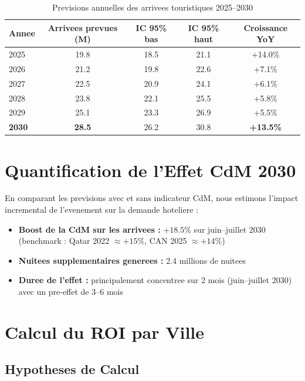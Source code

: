 \documentclass[12pt,a4paper]{report}
\begin{document}
\begin{itemize}[leftmargin=1.5em]
\begin{table}[H]
\centering\small\renewcommand{\arraystretch}{1.4}
\begin{tabular}{lcccc}
\toprule
\textbf{Annee} & \textbf{Arrivees prevues (M)} &
  \textbf{IC 95\% bas} & \textbf{IC 95\% haut} & \textbf{Croissance YoY} \\
\midrule
2025 & 19.8 & 18.5 & 21.1 & +14.0\% \\
2026 & 21.2 & 19.8 & 22.6 & +7.1\% \\
2027 & 22.5 & 20.9 & 24.1 & +6.1\% \\
2028 & 23.8 & 22.1 & 25.5 & +5.8\% \\
2029 & 25.1 & 23.3 & 26.9 & +5.5\% \\
\textbf{2030} & \textbf{28.5} & 26.2 & 30.8 & \textbf{+13.5\%} \\
\bottomrule
\end{tabular}
\caption{Previsions annuelles des arrivees touristiques 2025--2030}
\end{table}

\section{Quantification de l'Effet CdM 2030}

En comparant les previsions avec et sans indicateur CdM, nous estimons
l'impact incremental de l'evenement sur la demande hoteliere :

\begin{itemize}[leftmargin=1.5em]
  \item \textbf{Boost de la CdM sur les arrivees :}
        $+18.5\%$ sur juin--juillet 2030
        (benchmark : Qatar 2022 $\approx +15\%$, CAN 2025 $\approx +14\%$)
  \item \textbf{Nuitees supplementaires generees :}
        2.4 millions de nuitees
  \item \textbf{Duree de l'effet :} principalement concentree sur
        2 mois (juin--juillet 2030) avec un pre-effet de 3--6 mois
\end{itemize}

\section{Calcul du ROI par Ville}

\subsection{Hypotheses de Calcul}


\end{itemize}
\end{document}
